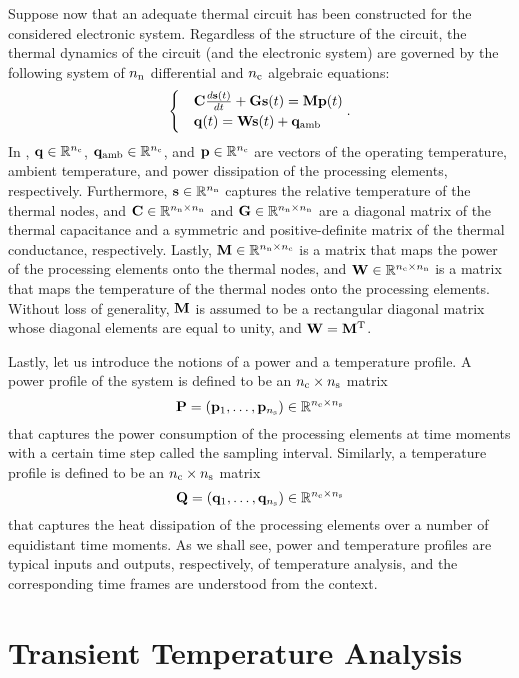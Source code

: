 Suppose now that an adequate thermal  circuit has been constructed for
the considered electronic system. Regardless of the structure of the circuit,
the thermal dynamics of the circuit (and the electronic system) are governed by
the following system of ${n_\mathrm{n}}$ differential and ${n_\mathrm{c}}$ algebraic equations:
\begin{equation} \elab{temperature-model-original}
  \begin{cases}
    & \m{C} \frac{d\vs(t)}{dt} + \m{G} \vs(t) = \m{M} \vp(t) \\
    & \vq(t) = \m{W} \vs(t) + \vq_\ambient
  \end{cases}.
\end{equation}
In , $\mathbf{q} \in \mathbb{R}^{n_\mathrm{c}}$, $\mathbf{q}_{\mathrm{amb}} \in
\mathbb{R}^{n_\mathrm{c}}$, and $\mathbf{p} \in \mathbb{R}^{n_\mathrm{c}}$ are vectors of the operating temperature,
ambient temperature, and power dissipation of the processing elements,
respectively. Furthermore, $\mathbf{s} \in \mathbb{R}^{n_\mathrm{n}}$ captures the relative temperature
of the thermal nodes, and $\mathbf{C} \in \mathbb{R}^{{n_\mathrm{n}} \times {n_\mathrm{n}}}$ and $\mathbf{G} \in
\mathbb{R}^{{n_\mathrm{n}} \times {n_\mathrm{n}}}$ are a diagonal matrix of the thermal capacitance and a
symmetric and positive-definite matrix of the thermal conductance, respectively.
Lastly, $\mathbf{M} \in \mathbb{R}^{{n_\mathrm{n}} \times {n_\mathrm{c}}}$ is a matrix that maps the power of
the processing elements onto the thermal nodes, and $\mathbf{W} \in \mathbb{R}^{{n_\mathrm{c}} \times
{n_\mathrm{n}}}$ is a matrix that maps the temperature of the thermal nodes onto the
processing elements. Without loss of generality, $\mathbf{M}$ is assumed to be a
rectangular diagonal matrix whose diagonal elements are equal to unity, and
$\mathbf{W} = \mathbf{M}^{\mathrm{T}}$.

Lastly, let us introduce the notions of a power and a temperature profile. A
power profile of the system is defined to be an ${n_\mathrm{c}} \times {n_\mathrm{s}}$ matrix
\[
  \mathbf{P} = \left( \mathbf{p}_1, \dots, \mathbf{p}_{n_\mathrm{s}} \right) \in \mathbb{R}^{{n_\mathrm{c}} \times {n_\mathrm{s}}}
\]
that captures the power consumption of the \nc processing elements at \ns time
moments with a certain time step \dt called the sampling interval. Similarly, a
temperature profile is defined to be an ${n_\mathrm{c}} \times {n_\mathrm{s}}$ matrix
\[
  \mathbf{Q} = \left( \mathbf{q}_1, \dots, \mathbf{q}_{n_\mathrm{s}} \right) \in \mathbb{R}^{{n_\mathrm{c}} \times {n_\mathrm{s}}}
\]
that captures the heat dissipation of the processing elements over a number of
equidistant time moments. As we shall see, power and temperature profiles are
typical inputs and outputs, respectively, of temperature analysis, and the
corresponding time frames are understood from the context.

\section{Transient Temperature Analysis}

